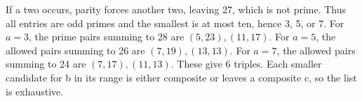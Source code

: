 If a two occurs, parity forces another two, leaving 27, which is not prime. Thus all entries are odd primes and the smallest is at most ten, hence 3, 5, or 7. For $a=3$, the prime pairs summing to 28 are $(5,23),(11,17)$. For $a=5$, the allowed pairs summing to 26 are $(7,19),(13,13)$. For $a=7$, the allowed pairs summing to 24 are $(7,17),(11,13)$. These give $\boxed6$ triples. Each smaller candidate for b in its range is either composite or leaves a composite c, so the list is exhaustive.
